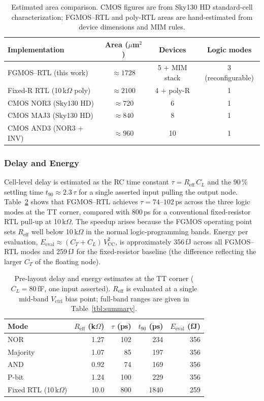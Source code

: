 \documentclass[a4paper,fleqn]{cas-sc}
\newcommand{\Vctrl}{V_{\mathrm{ctrl}}}
\newcommand{\Vcc}{V_{\mathrm{CC}}}
\newcommand{\Reff}{R_{\mathrm{eff}}}
\newcommand{\CL}{C_{L}}
\newcommand{\CT}{C_{T}}
\newcommand{\Eval}{E_{\mathrm{eval}}}
\begin{document}
\begin{table}[htb]
\centering
\caption{Estimated area comparison. CMOS figures are from Sky130 HD standard-cell
characterization; FGMOS--RTL and poly-RTL areas are hand-estimated from device
dimensions and MIM rules.}
\label{tbl:area_compare}
\begin{tabular}{@{}lccc@{}}
\toprule
Implementation           & Area ($\mu$m$^2$) & Devices        & Logic modes \\
\midrule
FGMOS--RTL (this work)   & $\approx 1728$    & 5 + MIM stack  & 3 (reconfigurable) \\
Fixed-R RTL (10\,k$\Omega$ poly) & $\approx 2100$ & 4 + poly-R & 1 \\
CMOS NOR3 (Sky130 HD)    & $\approx 720$     & 6              & 1 \\
CMOS MAJ3 (Sky130 HD)    & $\approx 840$     & 8              & 1 \\
CMOS AND3 (NOR3 + INV)   & $\approx 960$     & 10             & 1 \\
\bottomrule
\end{tabular}
\end{table}

\subsubsection{Delay and Energy}

Cell-level delay is estimated as the RC time constant $\tau = \Reff\,\CL$ and the
90\,\% settling time $t_{90} \approx 2.3\,\tau$ for a single asserted input pulling
the output node. Table~\ref{tbl:delay_energy} shows that FGMOS--RTL achieves
$\tau = 74$--$102$\,ps across the three logic modes at the TT corner, compared with
800\,ps for a conventional fixed-resistor RTL pull-up at 10\,k$\Omega$. The speedup
arises because the FGMOS operating point sets $\Reff$ well below 10\,k$\Omega$ in the
normal logic-programming bands. Energy per evaluation,
$\Eval \approx (\CT + \CL)\,\Vcc^2$, is approximately 356\,fJ across all FGMOS--RTL
modes and 259\,fJ for the fixed-resistor baseline (the difference reflecting the
larger $\CT$ of the floating node).

\begin{table}[htb]
\centering
\caption{Pre-layout delay and energy estimates at the TT corner ($\CL = 80$\,fF,
one input asserted). $\Reff$ is evaluated at a single mid-band $\Vctrl$ bias point;
full-band ranges are given in Table~\ref{tbl:summary}.}
\label{tbl:delay_energy}
\begin{tabular}{@{}lrrrr@{}}
\toprule
Mode      & $\Reff$ (k$\Omega$) & $\tau$ (ps) & $t_{90}$ (ps) & $\Eval$ (fJ) \\
\midrule
NOR       & 1.27 & 102 & 234 & 356 \\
Majority  & 1.07 &  85 & 197 & 356 \\
AND       & 0.92 &  74 & 169 & 356 \\
P-bit     & 1.24 & 100 & 229 & 356 \\
Fixed RTL (10\,k$\Omega$) & 10.0 & 800 & 1840 & 259 \\
\bottomrule
\end{tabular}
\end{table}
\end{document}
